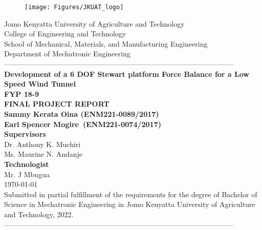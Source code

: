 \documentclass[12pt,fleqn]{article}
\begin{document}
\begin{titlepage}
  \begin{center}
    \vspace*{-4.0cm}
    \begin{figure}[!h]
      \centering
      \texttt{[image: Figures/JKUAT\_logo]}
      \label{fig:jomologo}
    \end{figure}
    \large{Jomo Kenyatta University of Agriculture and Technology}\\
    \large{College of Engineering and Technology}\\
    \large{School of Mechanical, Materials, and Manufacturing Engineering}\\
    \large{Department of Mechatronic Engineering}\\

    ------------------------------------------------------------------------------------------------\\[0.1cm]
    \vspace{0.1cm}
    \LARGE{\textbf{Development of a 6 DOF Stewart platform
        Force Balance for a Low Speed Wind Tunnel}}\\
    \vspace{0.2cm}
    \LARGE{\large\textbf{FYP 18-9
      }}\\
    {\large\textbf{FINAL PROJECT REPORT
    }}\\[0.1cm]

    \vspace{0.1cm}
    \large{\textbf{Sammy Kerata Oina (ENM221-0089/2017)
      }}\\
    \large{\textbf{Earl Spencer Mogire~(ENM221-0074/2017)
      }}\\[0.3cm]
    \large{\textbf{Supervisors}}\\
    \large{Dr. Anthony K. Muchiri
    }\\
    \large{Ms. Maurine N. Andanje
    }\\
    \large{\textbf{Technologist}}\\
    \large{Mr. J Mbugua
    }\\
    \large{\small{\today}}\\
    \small{Submitted in partial fulfillment of the requirements for the degree of Bachelor of Science in Mechatronic Engineering in Jomo Kenyatta University of Agriculture and Technology, 2022.}
    ------------------------------------------------------------------------------------------------\\[1.5cm]
  \end{center}
\end{titlepage}
\end{document}
